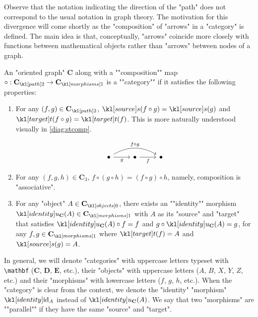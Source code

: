 \documentclass[main.tex]{subfiles}
\begin{document}
Observe that the notation indicating the direction of the "path" does not correspond to the usual notation in graph theory. The motivation for this divergence will come shortly as the "composition" of "arrows" in a "category" is defined. The main idea is that, conceptually, "arrows" coincide more closely with functions between mathematical objects rather than "arrows" between nodes of a graph.
\begin{defn}[Category]\label{defn:cat}
	\AP An "oriented graph" $\mathbf{C}$ along with a ""composition"" map $\circ: \mortwo{\mathbf{C}} \rightarrow \mor{\mathbf{C}}$ is a ""category"" if it satisfies the following properties:
	\begin{enumerate}
		\item For any $(f, g) \in \mortwo{\mathbf{C}}$, $\source(f \circ g) = \source(g)$ and $\target(f \circ g) = \target(f)$. This is more naturally understood visually in \eqref{diag:stcomp}.\begin{marginfigure}\begin{equation}\label{diag:stcomp}
			\begin{tikzcd}
				\bullet \arrow[r, "g"'] \arrow[rr, "f \circ g", bend left] & \bullet \arrow[r, "f"'] & \bullet
			\end{tikzcd}
		\end{equation}\end{marginfigure}
		\item For any $(f,g,h) \in \mathbf{C}_3$, $f\circ(g\circ h) = (f\circ g)\circ h$, namely, composition is "associative".
		\item For any "object" $A \in \obj{\mathbf{C}}$, there exists an ""identity"" morphism $\idu_{\mathbf{C}}(A) \in \mor{\mathbf{C}}$ with $A$ as its "source" and "target" that satisfies $\idu_{\mathbf{C}}(A) \circ f = f$ and $g \circ \idu_{\mathbf{C}}(A) = g$, for any $f,g \in \mor{\mathbf{C}}$ where $\target(f) = A$ and $\source(g) = A$.
	\end{enumerate}
\end{defn}
\begin{rem}[Notation]
	In general, we will denote "categories" with uppercase letters typeset with \verb!\mathbf! ($\mathbf{C}$, $\mathbf{D}$, $\mathbf{E}$, etc.), their "objects" with uppercase letters ($A$, $B$, $X$, $Y$, $Z$, etc.) and their "morphisms" with lowercase letters ($f$, $g$, $h$, etc.). When the "category" is clear from the context, we denote the "identity" "morphism" $\id_A$ instead of $\idu_{\mathbf{C}}(A)$. \AP We say that two "morphisms" are ""parallel"" if they have the same "source" and "target".
\end{rem}
\end{document}
